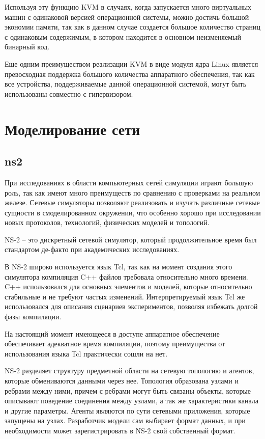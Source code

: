 
Используя эту функцию KVM в случаях, когда запускается много виртуальных
машин с одинаковой версией операционной системы, можно достичь большой экономии 
памяти, так как в данном случае создается
большое количество страниц с одинаковым содержимым, в котором находится в основном
неизменяемый бинарный код.

Еще одним преимуществом реализации KVM в виде модуля ядра Linux является превосходная
поддержка большого количества аппаратного обеспечения, так как все устройства, 
поддерживаемые данной операционной системой, могут быть использованы совместно
с гипервизором.
\cite{RedHat:kvm}



\section{Моделирование сети}

\subsection{ns2}

При исследованиях в области компьютерных сетей симуляции играют большую роль, так как
имеют много преимуществ по сравнению с проверками на реальном железе.
Сетевые симуляторы позволяют реализовать и изучать различные сетевые сущности в 
смоделированном окружении, что особенно хорошо при исследовании новых протоколов,
технологий, физических моделей и топологий.

NS-2 -- это дискретный сетевой симулятор, который продолжительное время был стандартом
де-факто при академических исследованиях.

В NS-2 широко используется язык Tcl, так как на момент создания этого симулятора
компиляция C++ файлов требовала относительно много времени. C++ использовался для
основных элементов и моделей, которые относительно стабильные и не требуют частых
изменений. Интерпретируемый язык Tcl же использовался для описания сценариев 
экспериментов, позволяя избежать долгой фазы компиляции.
\cite{Font:2010:ADS:1878537.1878651}

На настоящий момент имеющееся в доступе аппаратное обеспечение обеспечивает
адекватное время компиляции, поэтому преимущества от использования языка Tcl 
практически сошли на нет.

NS-2 разделяет структуру предметной области на сетевую топологию и агентов, которые
обмениваются данными через нее. Топология образована узлами и ребрами между ними,
причем с ребрами могут быть связаны объекты, которые описывают поведение соединения
между узлами, а так же характеристики канала и другие параметры.
Агенты являются по сути сетевыми приложения, которые запущены на узлах. Разработчик
модели сам выбирает формат данных, и при необходимости может зарегистрировать
в NS-2 свой собственный формат.

